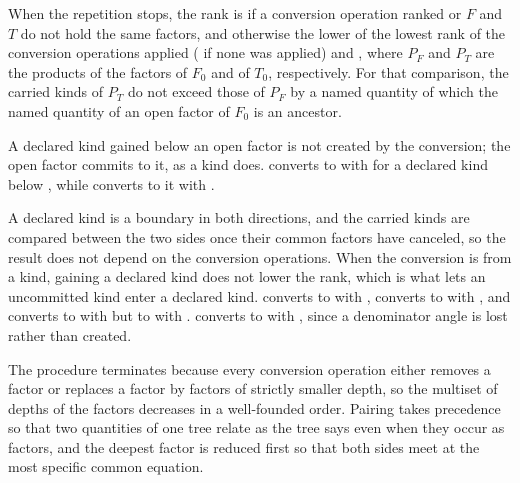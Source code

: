 \pnum
When the repetition stops, the rank is 
if a conversion operation ranked  or $F$ and $T$ do not hold the same factors,
and otherwise the lower of the lowest rank of the conversion operations applied
( if none was applied) and
,
where $P_F$ and $P_T$ are the products of the factors of $F_0$ and of $T_0$, respectively.
For that comparison, the carried kinds of $P_T$ do not exceed those of $P_F$
by a named quantity  of which the named quantity of an open factor of $F_0$ is an ancestor.
\begin{note}
A declared kind gained below an open factor is not created by the conversion;
the open factor commits to it, as a kind does.
 converts to  with 
for a declared kind  below , while
 converts to it with .
\end{note}
\begin{note}
A declared kind is a boundary in both directions, and the carried kinds are compared
between the two sides once their common factors have canceled, so the result does not depend on the conversion operations.
When the conversion is from a kind, gaining a declared kind does not lower the rank,
which is what lets an uncommitted kind enter a declared kind.
 converts to  with
,  converts to
 with , and
 converts to  with
 but to  with .
 converts to  with
, since a denominator angle is lost rather than created.
\end{note}
\begin{note}
The procedure terminates because every conversion operation either removes a factor or
replaces a factor by factors of strictly smaller depth,
so the multiset of depths of the factors decreases in a well-founded order.
Pairing takes precedence so that two quantities of one tree relate as the tree says even
when they occur as factors, and the deepest factor is reduced first so that
both sides meet at the most specific common equation.
\end{note}
